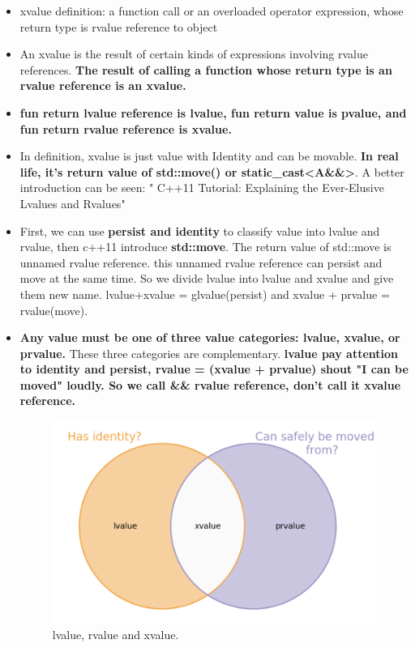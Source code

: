 \documentclass[a4paper,11pt,twoside]{book}
\begin{document}
\begin{itemize}
	\item xvalue definition: a function call or an overloaded operator expression, whose return type is rvalue reference to object
	
	\item An xvalue is the result of certain kinds of expressions involving rvalue references. \textbf{The result of calling a function whose return type is an rvalue reference is an xvalue.}
	
	\item \textbf{fun return lvalue reference is lvalue, fun return value is pvalue, and fun return rvalue reference is xvalue.}
	
	\item In definition,  xvalue is just value with Identity and can be movable. \textbf{In real life, it's  return value of std::move() or static\_cast<A\&\&>}. A better introduction can be seen: " C++11 Tutorial: Explaining the Ever-Elusive Lvalues and Rvalues"
	
	
	\item First, we can use \textbf{persist and identity} to classify value into lvalue and rvalue, then c++11 introduce \textbf{std::move}. The return value of std::move is unnamed rvalue reference. this unnamed rvalue reference can persist and move at the same time.  So we divide lvalue into lvalue and xvalue and give them new name.  lvalue+xvalue = glvalue(persist)  and xvalue + prvalue = rvalue(move).
	
	\item \textbf{Any value must be one of three value categories: lvalue, xvalue, or prvalue.} These three categories are complementary.  \textbf{lvalue pay attention to  identity and persist, rvalue = (xvalue + prvalue) shout "I can be moved" loudly.  So we call \&\& rvalue reference, don't call it xvalue reference. }
	
	\begin{figure}[h]
		\centering
		\includegraphics[width=0.4\linewidth]{pics/xvalue1.png}
		\caption{lvalue, rvalue and xvalue.}
		\label{fig:xvalue1}
	\end{figure}
	

\end{itemize}
\end{document}
